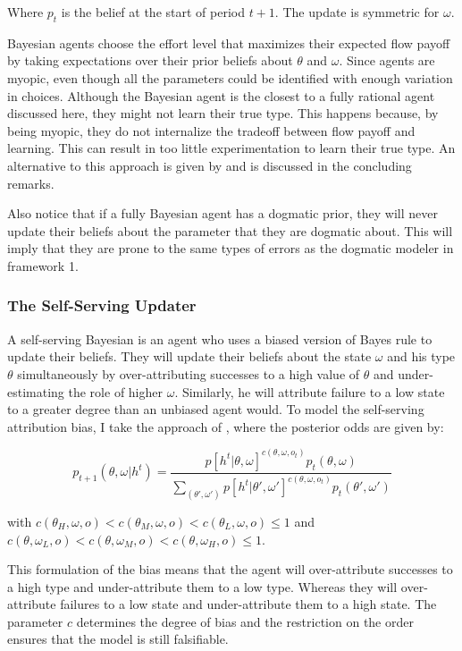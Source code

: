\documentclass[
  12pt,
]{article}
\begin{document}
Where \(p_{t}\) is the belief at the start of period \(t+1\). The update
is symmetric for \(\omega\).

Bayesian agents choose the effort level that maximizes their expected
flow payoff by taking expectations over their prior beliefs about
\(\theta\) and \(\omega\). Since agents are myopic, even though all the
parameters could be identified with enough variation in choices.
Although the Bayesian agent is the closest to a fully rational agent
discussed here, they might not learn their true type. This happens
because, by being myopic, they do not internalize the tradeoff between
flow payoff and learning. This can result in too little experimentation
to learn their true type. An alternative to this approach is given by
\citet{Hestermann2021} and is discussed in the concluding remarks.

Also notice that if a fully Bayesian agent has a dogmatic prior, they
will never update their beliefs about the parameter that they are
dogmatic about. This will imply that they are prone to the same types of
errors as the dogmatic modeler in framework 1.

\hypertarget{the-self-serving-updater}{%
\subsubsection{The Self-Serving
Updater}\label{the-self-serving-updater}}

A self-serving Bayesian is an agent who uses a biased version of Bayes
rule to update their beliefs. They will update their beliefs about the
state \(\omega\) and his type \(\theta\) simultaneously by
over-attributing successes to a high value of \(\theta\) and
under-estimating the role of higher \(\omega\). Similarly, he will
attribute failure to a low state to a greater degree than an unbiased
agent would. To model the self-serving attribution bias, I take the
approach of \citet{benjamin2019}, where the posterior odds are given by:

\[
p_{t+1}(\theta, \omega| h^t) = \frac{p[h^t|\theta, \omega]^{c(\theta, \omega, o_t)}p_t(\theta, \omega)}{\sum_{(\theta', \omega')}p[h^t|\theta', \omega']^{c(\theta, \omega, o_t)}p_t(\theta', \omega')}
\]

with
\(c(\theta_H, \omega, o)<c(\theta_M, \omega, o)<c(\theta_L, \omega, o)\leq 1\)
and
\(c(\theta, \omega_L, o)<c(\theta, \omega_M, o)<c(\theta, \omega_H, o)\leq 1\).

This formulation of the bias means that the agent will over-attribute
successes to a high type and under-attribute them to a low type. Whereas
they will over-attribute failures to a low state and under-attribute
them to a high state. The parameter \(c\) determines the degree of bias
and the restriction on the order ensures that the model is still
falsifiable.
\end{document}
